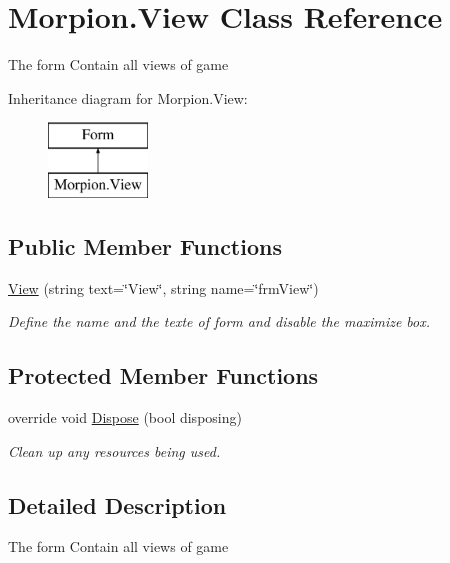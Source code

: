 \hypertarget{class_morpion_1_1_view}{}\section{Morpion.\+View Class Reference}
\label{class_morpion_1_1_view}


The form Contain all views of game  


Inheritance diagram for Morpion.\+View\+:\begin{figure}[H]
\begin{center}
\leavevmode
\includegraphics[height=2.000000cm]{class_morpion_1_1_view}
\end{center}
\end{figure}
\subsection*{Public Member Functions}
\begin{DoxyCompactItemize}
\item 
\hyperlink{class_morpion_1_1_view_ab8a0a6c6141f31f7e175ba5ad49140c3}{View} (string text=\char`\"{}View\char`\"{}, string name=\char`\"{}frm\+View\char`\"{})
\begin{DoxyCompactList}\small\item\em Define the name and the texte of form and disable the maximize box. \end{DoxyCompactList}\end{DoxyCompactItemize}
\subsection*{Protected Member Functions}
\begin{DoxyCompactItemize}
\item 
override void \hyperlink{class_morpion_1_1_view_a3c537c54a79236b4cfd9e78415dd48f5}{Dispose} (bool disposing)
\begin{DoxyCompactList}\small\item\em Clean up any resources being used. \end{DoxyCompactList}\end{DoxyCompactItemize}


\subsection{Detailed Description}
The form Contain all views of game 

